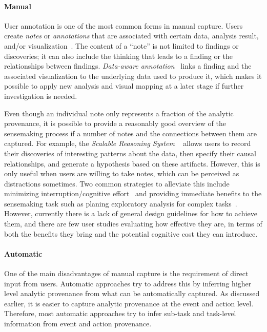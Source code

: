 \paragraph{Manual}
User annotation is one of the most common forms in manual capture. Users create \emph{notes} or \emph{annotations} that are associated with certain data, analysis result, and/or visualization~\cite{Heer2009,Walker2013}. The content of a ``note'' is not limited to findings or discoveries; it can also include the thinking that leads to a finding or the relationships between findings. \emph{Data-aware annotation}~\cite{Heer2008a} links a finding and the associated visualization to the underlying data used to produce it, which makes it possible to apply new analysis and visual mapping at a later stage if further investigation is needed. 

Even though an individual note only represents a fraction of the analytic provenance, it is possible to provide a reasonably good overview of the sensemaking process if a number of notes and the connections between them are captured. For example, the \emph{Scalable Reasoning System} ~\cite{Pike2009a} allows users to record their discoveries of interesting patterns about the data, then specify their causal relationships, and generate a hypothesis based on these artifacts. However, this is only useful when users are willing to take notes, which can be perceived as distractions sometimes. Two common strategies to alleviate this include minimizing interruption/cognitive effort~\cite{Hong2008} and providing immediate benefits to the sensemaking task such as planing exploratory analysis for complex tasks~\cite{Lunzer2014}. However, currently there is a lack of general design guidelines for how to achieve them, and there are few user studies evaluating how effective they are, in terms of both the benefits they bring and the potential cognitive cost they can introduce. 

\paragraph{Automatic}
One of the main disadvantages of manual capture is the requirement of direct input from users. Automatic approaches try to address this by inferring higher level analytic provenance from what can be automatically captured. As discussed earlier, it is easier to capture analytic provenance at the event and action level. Therefore, most automatic approaches try to infer sub-task and task-level information from event and action provenance.

